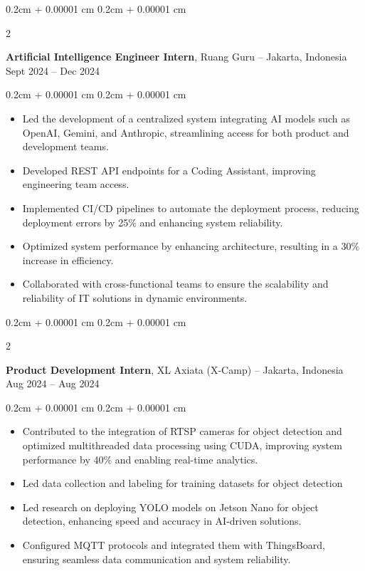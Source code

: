 \documentclass[10pt, a4paper]{article}
\newenvironment{highlights}{
    \begin{itemize}[
        topsep=0cm,
        parsep=0cm,
        partopsep=0pt,
        itemsep=0pt,
        leftmargin=0cm + 10pt
    ]
}{
    \end{itemize}
} %
\newenvironment{onecolentry}{
    \begin{adjustwidth}{
        0.2cm + 0.00001 cm
    }{
        0.2cm + 0.00001 cm
    }
}{
    \end{adjustwidth}
} %
\newenvironment{twocolentry}[2][]{
    \onecolentry
    \def\secondColumn{#2}
    \setcolumnwidth{\fill, 4.5cm}
    \begin{paracol}{2}
}{
    \switchcolumn \raggedleft \secondColumn
    \end{paracol}
    \endonecolentry
} %
\begin{document}
        \vspace{0.1cm}

        \begin{twocolentry}{
            Sept 2024 – Dec 2024
        }
            \textbf{Artificial Intelligence Engineer Intern}, Ruang Guru -- Jakarta, Indonesia\end{twocolentry}

        \vspace{0cm}
        \begin{onecolentry}
            \begin{highlights}
                \item Led the development of a centralized system integrating AI models such as OpenAI, Gemini, and Anthropic, streamlining access for both product and development teams.
                \item Developed REST API endpoints for a Coding Assistant, improving engineering team access.
                \item Implemented CI/CD pipelines to automate the deployment process, reducing deployment errors by 25\% and enhancing system reliability.
                \item Optimized system performance by enhancing architecture, resulting in a 30\% increase in efficiency.
                \item Collaborated with cross-functional teams to ensure the scalability and reliability of IT solutions in dynamic environments.
            \end{highlights}
        \end{onecolentry}


        \vspace{0.1cm}

        \begin{twocolentry}{
            Aug 2024 – Aug 2024
        }
            \textbf{Product Development Intern}, XL Axiata (X-Camp) -- Jakarta, Indonesia\end{twocolentry}

        \vspace{0cm}
        \begin{onecolentry}
            \begin{highlights}
                \item Contributed to the integration of RTSP cameras for object detection and optimized multithreaded data processing using CUDA, improving system performance by 40\% and enabling real-time analytics.
                \item Led data collection and labeling for training datasets for object detection
                \item Led research on deploying YOLO models on Jetson Nano for object detection, enhancing speed and accuracy in AI-driven solutions.
                \item Configured MQTT protocols and integrated them with ThingsBoard, ensuring seamless data communication and system reliability.
            \end{highlights}
        \end{onecolentry}
\end{document}
